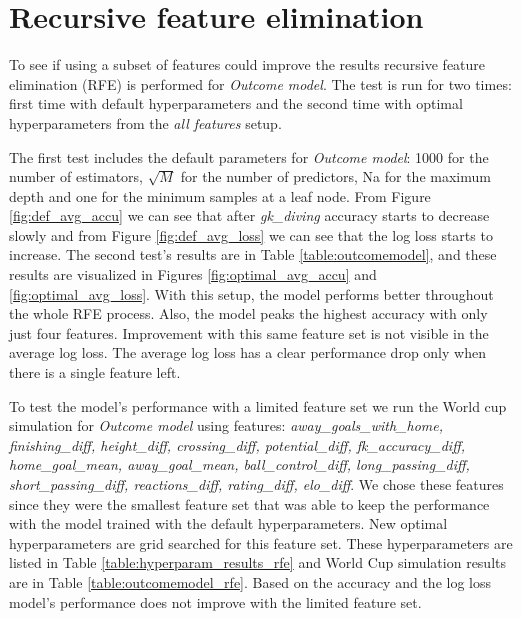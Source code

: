 \section{Recursive feature elimination}
To see if using a subset of features could improve the results recursive feature elimination (RFE) is performed for \textit{Outcome model}. The test is run for two times: first time with default hyperparameters and the second time with optimal hyperparameters from the \textit{all features} setup.

The first test includes the default parameters for \textit{Outcome model}: 1000 for the number of estimators, $\sqrt{M}$ for the number of predictors, Na for the maximum depth and one for the minimum samples at a leaf node. From Figure \ref{fig:def_avg_accu} we can see that after \textit{gk\_diving} accuracy starts to decrease slowly and from Figure \ref{fig:def_avg_loss} we can see that the log loss starts to increase. The second test's results are in Table \ref{table:outcomemodel}, and these results are visualized in Figures \ref{fig:optimal_avg_accu} and \ref{fig:optimal_avg_loss}. With this setup, the model performs better throughout the whole RFE process. Also, the model peaks the highest accuracy with only just four features. Improvement with this same feature set is not visible in the average log loss. The average log loss has a clear performance drop only when there is a single feature left.

To test the model's performance with a limited feature set we run the World cup simulation for \textit{Outcome model} using features: \textit{away\_goals\_with\_home, finishing\_diff, height\_diff, crossing\_diff, potential\_diff, fk\_accuracy\_diff, home\_goal\_mean, away\_goal\_mean, ball\_control\_diff, long\_passing\_diff,  short\_passing\_diff, reactions\_diff, rating\_diff, elo\_diff}. We chose these features since they were the smallest feature set that was able to keep the performance with the model trained with the default hyperparameters. New optimal hyperparameters are grid searched for this feature set. These hyperparameters are listed in Table \ref{table:hyperparam_results_rfe} and World Cup simulation results are in Table \ref{table:outcomemodel_rfe}. Based on the accuracy and the log loss model's performance does not improve with the limited feature set.


